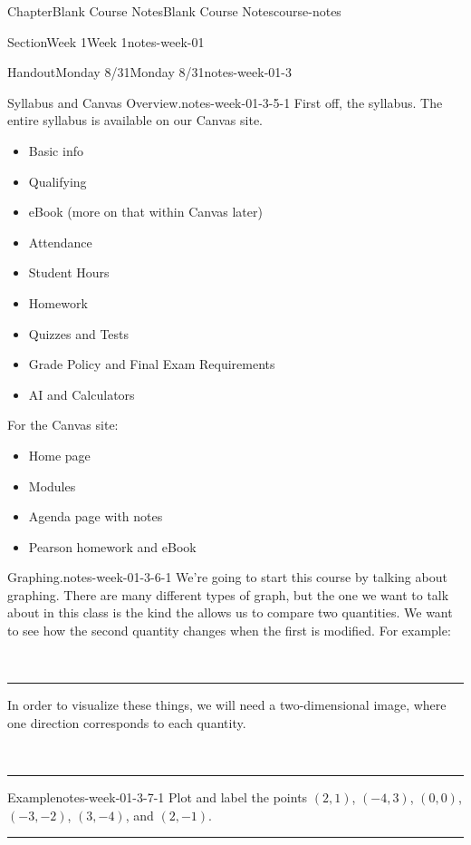 \documentclass[twoside,14pt,]{extbook}
\newcommand{\ptxlistdisc}{\raisebox{0.3ex}{\textbullet}}
\newlength{\ptxworkspacestrutwidth}
\begin{document}
\begin{chapterptx}{Chapter}{Blank Course Notes}{}{Blank Course Notes}{}{}{course-notes}
\begin{sectionptx}{Section}{Week 1}{}{Week 1}{}{}{notes-week-01}
\begin{handout-subsection}{Handout}{Monday 8\slash{}31}{}{Monday 8\slash{}31}{}{}{notes-week-01-3}
\clearpage
\begin{paragraphs}{Syllabus and Canvas Overview.}{notes-week-01-3-5-1}%
First off, the syllabus. The entire syllabus is available on our Canvas site.%
\par
%
\begin{itemize}[label=\ptxlistdisc]
\item{}Basic info%
\item{}Qualifying%
\item{}eBook (more on that within Canvas later)%
\item{}Attendance%
\item{}Student Hours%
\item{}Homework%
\item{}Quizzes and Tests%
\item{}Grade Policy and Final Exam Requirements%
\item{}AI and Calculators%
\end{itemize}
%
\par
For the Canvas site:%
\begin{itemize}[label=\ptxlistdisc]
\item{}Home page%
\item{}Modules%
\item{}Agenda page with notes%
\item{}Pearson homework and eBook%
\end{itemize}
%
\end{paragraphs}%
\clearpage
\begin{paragraphs}{Graphing.}{notes-week-01-3-6-1}%
We're going to start this course by talking about graphing. There are many different types of graph, but the one we want to talk about in this class is the kind the allows us to compare two quantities. We want to see how the second quantity changes when the first is modified. For example:%
\par
~%
\par\rule{\ptxworkspacestrutwidth}{2in}%
\par
In order to visualize these things, we will need a two-dimensional image, where one direction corresponds to each quantity.%
\par
~%
\par\rule{\ptxworkspacestrutwidth}{2in}%
\end{paragraphs}%
\clearpage
\begin{example}{Example}{}{notes-week-01-3-7-1}%
Plot and label the points \((2,1)\), \((-4,3)\), \((0,0)\), \((-3,-2)\), \((3,-4)\), and \((2,-1)\).%
\par\rule{\ptxworkspacestrutwidth}{3in}%

\end{example}
\end{handout-subsection}
\end{sectionptx}
\end{chapterptx}
\end{document}
